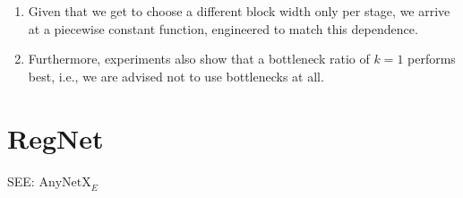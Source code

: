 \begin{enumerate}[itemsep=0.15cm]
\begin{enumerate}
        \item Given that we get to choose a different block width only per stage, we arrive at a piecewise constant function, engineered to match this dependence. 
        
        \item Furthermore, experiments also show that a bottleneck ratio of $k = 1$ performs best, i.e., we are advised not to use bottlenecks at all.

        
    \end{enumerate}



\end{enumerate}


\section{RegNet \cite{dnn-1}} \label{RegNet}

SEE: $\textrm{AnyNetX}_E$ 

